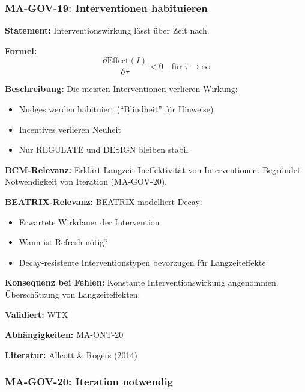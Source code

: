 \subsubsection*{MA-GOV-19: Interventionen habituieren}

\textbf{Statement:} Interventionswirkung lässt über Zeit nach.

\textbf{Formel:}
\begin{equation}
\frac{\partial \text{Effect}(I)}{\partial \tau} < 0 \quad \text{für } \tau \rightarrow \infty
\end{equation}

\textbf{Beschreibung:}
Die meisten Interventionen verlieren Wirkung:
\begin{itemize}
    \item Nudges werden habituiert (``Blindheit'' für Hinweise)
    \item Incentives verlieren Neuheit
    \item Nur REGULATE und DESIGN bleiben stabil
\end{itemize}

\textbf{BCM-Relevanz:}
Erklärt Langzeit-Ineffektivität von Interventionen. Begründet Notwendigkeit von Iteration (MA-GOV-20).

\textbf{BEATRIX-Relevanz:}
BEATRIX modelliert Decay:
\begin{itemize}
    \item Erwartete Wirkdauer der Intervention
    \item Wann ist Refresh nötig?
    \item Decay-resistente Interventionstypen bevorzugen für Langzeiteffekte
\end{itemize}

\textbf{Konsequenz bei Fehlen:}
Konstante Interventionswirkung angenommen. Überschätzung von Langzeiteffekten.

\textbf{Validiert:} WTX

\textbf{Abhängigkeiten:} MA-ONT-20

\textbf{Literatur:} Allcott \& Rogers (2014)


\subsubsection*{MA-GOV-20: Iteration notwendig}

